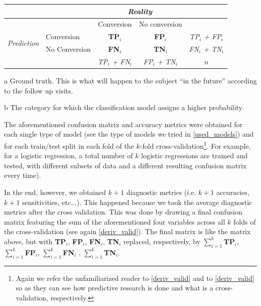 \documentclass[a4paper,12pt]{elsarticle}  %
\begin{document}
\begin{table}[h]
	\centering
	\begin{threeparttable}
		\begin{tabular}{llccc}
			
			& & \multicolumn{2}{c}{\textit{Reality\tnote{a}}} & \\
			\toprule
			& & Conversion & No conversion &  \\
			\midrule
			\multirow{2}{*}{\textit{Prediction\tnote{b}}} & Conversion & \textbf{TP$_{i}$}  & \textbf{FP$_{i}$} & \textit{TP$_{i}$ + FP$_{i}$} \\
			 & No Conversion & \textbf{FN$_{i}$} & \textbf{TN$_{i}$} & \textit{FN$_{i}$ + TN$_{i}$} \\
			 & & \textit{TP$_{i}$ + FN$_{i}$} & \textit{FP$_{i}$ + TN$_{i}$} & $n$ \\
			\bottomrule
		\end{tabular}
		\begin{tablenotes}
			\item[\scriptsize a]{\footnotesize Ground truth. This is what will happen to the subject ``in the future'' according to the follow up visits.}
			\item[\scriptsize b]{\footnotesize The category for which the classification model assigns a higher probability.}
		\end{tablenotes}
	\end{threeparttable}
\end{table}

The aforementioned confusion matrix and accuracy metrics were obtained for each single type of model (see the type of models we tried in \ref{used_models}) and for each train/test split in each fold of the $k$-fold cross-validation\footnote{Again we refer the unfamiliarized reader to \ref{deriv_valid} and to \ref{deriv_valid} so as they can see how predictive research is done and what is a cross-validation, respectively.}. For example, for a logistic regression, a total number of $k$ logistic regressions are trained and tested, with different subsets of data and a different resulting confusion matrix every time). 

In the end, however, we obtained $k + 1$ diagnostic metrics (i.e. $k + 1$ accuracies, $k+1$ sensitivities, etc...). This happened because we took the average diagnostic metrics after the cross validation. This was done by drawing a final confusion matrix featuring the sum of the aforementioned four variables across all $k$ folds of the cross-validation (see again \ref{deriv_valid}). The final matrix is like the matrix above, but with \textbf{TP$_{i}$}, \textbf{FP$_{i}$}, \textbf{FN$_{i}$}, \textbf{TN$_{i}$} replaced, respectively, by $\sum_{i=1}^{k}\textbf{TP}_{i}$, $\sum_{i=1}^{k}$\textbf{FP}$_{i}$, $\sum_{i=1}^{k}$\textbf{FN}$_{i}$ , $\sum_{i=1}^{k}$\textbf{TN}$_{i}$. 
\end{document}
